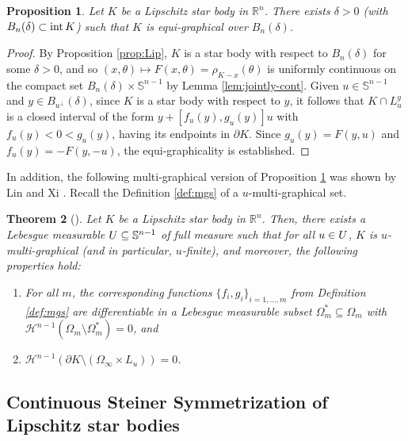\documentclass[11pt]{article}
\newtheorem{thm}{Theorem}[section]
\newtheorem{prop}[thm]{Proposition}
\theoremstyle{definition}
\theoremstyle{proof}
\DeclareMathOperator{\+}{\mathop{\tilde{+}}}
\DeclareMathOperator{\interior}{\textnormal{int}}
\newcommand{\R}{\mathbb{R}}
\renewcommand{\S}{\mathbb{S}}
\renewcommand{\H}{\mathcal{H}}
\numberwithin{equation}{section}
\numberwithin{equation}{section}
\begin{document}
\begin{prop} \label{prop:graphical}
Let $K$ be a Lipschitz star body in $\R^n$. There exists $\delta > 0$ (with $B_n(\delta) \subset \interior K$) such that $K$ is equi-graphical over $B_n(\delta)$. 
\end{prop}
\begin{proof}
By Proposition \ref{prop:Lip}, $K$ is a star body with respect to $B_n(\delta)$ for some $\delta > 0$, and so $(x,\theta) \mapsto F(x,\theta) = \rho_{K - x}(\theta)$ is uniformly continuous on the compact set $B_n(\delta) \times \S^{n-1}$ by Lemma  \ref{lem:jointly-cont}. 
Given $u \in \S^{n-1}$ and $y \in B_{u^{\perp}}(\delta)$, since $K$ is a star body with respect to $y$, it follows that $K \cap L_u^y$ is a closed interval of the form $y + [f_u(y),g_u(y)] u$ with $f_u(y) < 0 < g_u(y)$, having its endpoints in $\partial K$. Since $g_u(y) = F(y,u)$ and $f_u(y) = -F(y,-u)$, the equi-graphicality is established.
\end{proof}

In addition, the following multi-graphical version of Proposition \ref{prop:graphical} was shown by Lin and Xi \cite[Lemma 2.2, Section 3 and Theorem 4.1]{LinXi-LipschitzStarBodySymmetrization}. Recall the Definition \ref{def:mgs} of a $u$-multi-graphical set. 
\begin{thm}[\cite{LinXi-LipschitzStarBodySymmetrization}] \label{thm:Lip-multi-graphical}
Let $K$ be a Lipschitz star body in $\R^n$. Then, there exists a Lebesgue measurable $\U \subseteq \S^{n-1}$ of full measure such that for all $u \in U$, $K$ is $u$-multi-graphical (and in particular, $u$-finite), and moreover, the following properties hold:
\begin{enumerate}
\item For all $m$, the corresponding functions $\{f_i,g_i\}_{i=1,\ldots,m}$ from Definition \ref{def:mgs} are differentiable in a Lebesgue measurable subset $\Omega_m^* \subseteq \Omega_m$ with $\H^{n-1}(\Omega_m \setminus \Omega_m^*) =0$, and
\item $\H^{n-1}(\partial K \setminus (\Omega_\infty \times L_u)) = 0$. 
\end{enumerate}
\end{thm}





\subsection{Continuous Steiner Symmetrization of Lipschitz star bodies}
\end{document}
